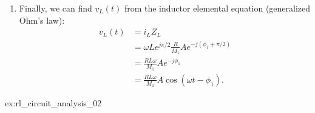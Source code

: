 \documentclass[electronics.tex]{subfiles}
\begin{document}
{\begin{enumerate}
\begin{enumerate}
\begin{tabular}{l|r}
					$\begin{aligned}[t]
						L \\
						R
					\end{aligned}$ &
					$\begin{aligned}[t]
					i_L &= v_R/Z_L\\
					v_R &= (I_s - i_L) Z_R
					\end{aligned}$ \\
				\end{tabular}
			\item Substituting the $R$ equation into the $L$ equation, we eliminate $v_R$ to obtain
				\begin{align*}
					i_L &= \frac{Z_R}{Z_L} \left(I_s - i_L\right).
				\end{align*}
			\item Solving, 
				\begin{align*}
					i_L = \frac{Z_R}{Z_R + Z_L} I_s.
				\end{align*}
				All that remains is to substitute, noting that we're using the cosine form of the phasor,
				\begin{align*}
					i_L &= \frac{R}{R+j\omega L} A e^{-j\pi/2} \\
					&= \frac{R e^{j0}}{M_1 e^{j\phi_1}}  A e^{-j\pi/2} \\
					&= \frac{R}{M_1} A e^{-j\phi_1} e^{-j\pi/2}\\
					&= \frac{R}{M_1} A e^{-j(\phi_1+\pi/2)}\\
					&= \frac{R}{M_1} A \cos(\omega t - \phi_1 -\pi/2)\\
					&= \frac{R}{M_1} A \sin(\omega t - \phi_1)
				\end{align*}
				where
				\begin{align*}
					M_1 &= \sqrt{R^2 + (L\omega)^2} \text{ and} \\
					\phi_1 &= \arctan(L\omega/R).
				\end{align*}
				Note that we could have used the unconventional sine form of the phasor.
				Also note that (i) this was somewhat easier than how we did it in \autoref{ex:rl_circuit_analysis_01} and (ii) the result simply scales the amplitude and shifts the phase, as expected.
		\end{enumerate}		
		\item Finally, we can find $v_L(t)$ from the inductor elemental equation (generalized Ohm's law):
			\begin{align*}
				v_L(t) &=
				i_L Z_L \\
				&= \omega L e^{j\pi/2} \frac{R}{M_1} A e^{-j(\phi_1+\pi/2)} \\
				&= \frac{R L \omega}{M_1} A e^{-j\phi_1} \\
				&= \frac{R L \omega}{M_1} A \cos(\omega t - \phi_1). 
			\end{align*}
	\end{enumerate}
}{%
ex:rl_circuit_analysis_02%
}
\end{document}
